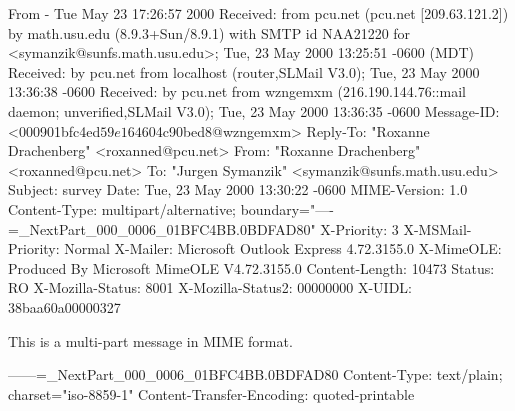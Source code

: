 From - Tue May 23 17:26:57 2000
Received: from pcu.net (pcu.net [209.63.121.2])
	by math.usu.edu (8.9.3+Sun/8.9.1) with SMTP id NAA21220
	for <symanzik@sunfs.math.usu.edu>; Tue, 23 May 2000 13:25:51 -0600 (MDT)
Received: by pcu.net from localhost
    (router,SLMail V3.0); Tue, 23 May 2000 13:36:38 -0600
Received: by pcu.net from wzngemxm
    (216.190.144.76::mail daemon; unverified,SLMail V3.0); Tue, 23 May 2000 13:36:35 -0600
Message-ID: <000901bfc4ed$59e16460$4c90bed8@wzngemxm>
Reply-To: "Roxanne Drachenberg" <roxanned@pcu.net>
From: "Roxanne Drachenberg" <roxanned@pcu.net>
To: "Jurgen Symanzik" <symanzik@sunfs.math.usu.edu>
Subject: survey
Date: Tue, 23 May 2000 13:30:22 -0600
MIME-Version: 1.0
Content-Type: multipart/alternative;
	boundary="----=_NextPart_000_0006_01BFC4BB.0BDFAD80"
X-Priority: 3
X-MSMail-Priority: Normal
X-Mailer: Microsoft Outlook Express 4.72.3155.0
X-MimeOLE: Produced By Microsoft MimeOLE V4.72.3155.0
Content-Length: 10473
Status: RO
X-Mozilla-Status: 8001
X-Mozilla-Status2: 00000000
X-UIDL: 38baa60a00000327

This is a multi-part message in MIME format.

------=_NextPart_000_0006_01BFC4BB.0BDFAD80
Content-Type: text/plain;
	charset="iso-8859-1"
Content-Transfer-Encoding: quoted-printable

